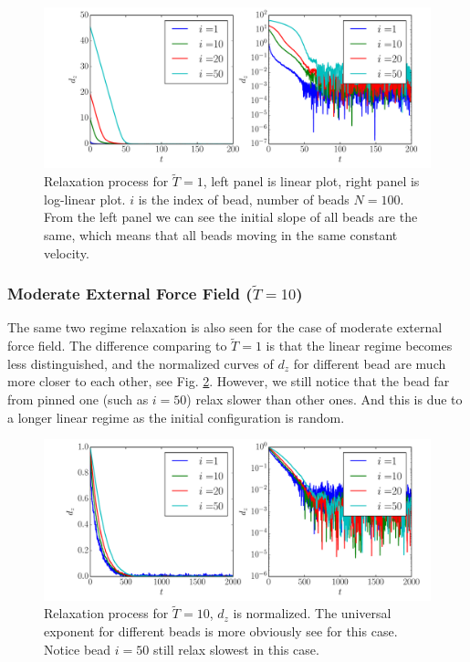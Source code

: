 \documentclass[12pt,a4paper]{article}
\begin{document}
\begin{figure}[htpb]
    \centering
    \includegraphics[width=1.0\linewidth]{fig4report/bd_N100_T1_un.pdf}
    \caption{ Relaxation process for $\tilde{T}=1$, left panel is linear plot,
        right panel is log-linear plot. $i$ is the index of bead, number of
        beads $N=100$. From the left panel we can see the initial slope of all
        beads are the same, which means that all beads moving in the same
        constant velocity.}
    \label{fig:bdt1}
\end{figure}

\subsubsection{Moderate External Force Field ($\tilde{T} = 10$)}
The same two regime relaxation is also seen for the case of moderate external
force field. The difference comparing to $\tilde{T} = 1$ is that the linear
regime becomes less distinguished, and the normalized curves of $d_z$ for
different bead are much more closer to each other, see Fig. \ref{fig:bdt10}.
However, we still notice that the bead far from pinned one (such as $i=50$)
relax slower than other ones. And this is due to a longer linear regime as the
initial configuration is random.
\begin{figure}[htpb]
    \centering
    \includegraphics[width=1.0\linewidth]{fig4report/bd_N100_T10.pdf}
    \caption{Relaxation process for $\tilde{T}=10$, $d_z$ is normalized. The
        universal exponent for different beads is more obviously see for this
        case. Notice bead $i=50$ still relax slowest in this case.}
    \label{fig:bdt10}
\end{figure}
\end{document}
